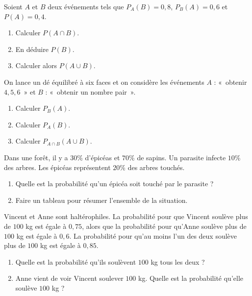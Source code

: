 \documentclass[11pt]{article}
\begin{document}
\begin{exo}
Soient $A$ et $B$ deux événements tels que $P_A(B)=0,8$,
$P_B(A)=0,6$ et $P(A)=0,4$.
\begin{enumerate}
  \item Calculer $P(A\cap B)$.
  \item En déduire $P(B)$.
  \item Calculer alors $P(A\cup B)$.
\end{enumerate}
\end{exo}

\begin{exo}
On lance un dé équilibré à six faces et on considère les
événements $A$ : «~obtenir $4, 5, 6$~» et $B$ : «~obtenir un nombre pair~».
\begin{enumerate}
  \item Calculer $P_{B}(A)$.
  \item Calculer $P_A(B)$.
  \item Calculer $P_{A\cap B}(A\cup B)$.
\end{enumerate}
\end{exo}

\begin{exo}
Dans une forêt, il y a $30$\% d'épicéas et $70$\% de sapins. Un parasite infecte
$10$\% des arbres. Les épicéas représentent $20$\% des arbres touchés.
\begin{enumerate}
  \item Quelle est la probabilité qu'un épicéa soit touché par le parasite ?
  \item Faire un tableau pour résumer l'ensemble de la situation.
\end{enumerate}
\end{exo}

\begin{exo}
Vincent et Anne sont haltérophiles. La probabilité pour que Vincent soulève plus
de $100$ kg est égale à $0,75$, alors que la probabilité pour qu'Anne soulève
plus de $100$ kg est égale à $0,6$. La probabilité pour qu'au moins l'un des
deux soulève plus de $100$ kg est égale à $0,85$.
\begin{enumerate}
  \item Quelle est la probabilité qu'ils soulèvent $100$ kg tous les deux ?
  \item Anne vient de voir Vincent soulever $100$ kg. Quelle est la probabilité
    qu'elle soulève $100$ kg ?
\end{enumerate}
\end{exo}
\end{document}
